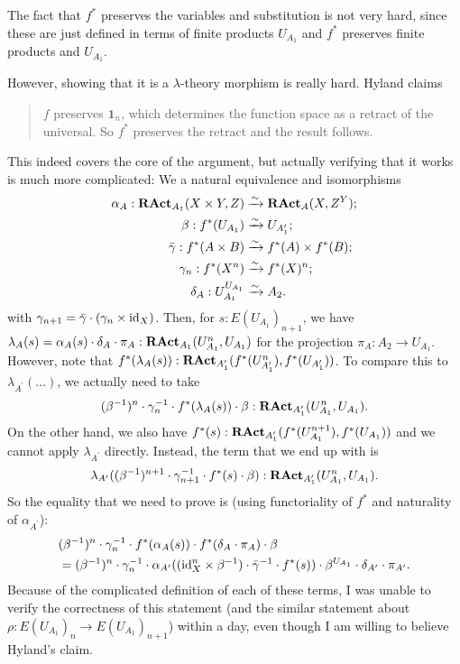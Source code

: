\begin{remark}
  The fact that $ f^* $ preserves the variables and substitution is not very hard, since these are just defined in terms of finite products $ U_{A_1} $ and $ f^* $ preserves finite products and $ U_{A_1} $.

  However, showing that it is a $ \lambda $-theory morphism is really hard. Hyland claims
  \begin{quote}
    $ f $ preserves $ \mathbf 1_n $, which determines the function space as a retract of the universal. So $ f^* $ preserves the retract and the result follows.
  \end{quote}
  This indeed covers the core of the argument, but actually verifying that it works is much more complicated: We a natural equivalence and isomorphisms
  \begin{align*}
    \alpha_A: \mathbf{RAct}_{A_1}(X \times Y, Z) &\xrightarrow{\sim} \mathbf{RAct}_{A}(X, Z^Y);\\
    \beta: f^*(U_{A_1}) &\xrightarrow{\sim} U_{A_1^\prime};\\
    \bar \gamma: f^*(A \times B) &\xrightarrow{\sim} f^*(A) \times f^*(B);\\
    \gamma_n: f^*(X^n) &\xrightarrow{\sim} f^*(X)^n;\\
    \delta_A: U_{A_1}^{U_{A_1}} &\xrightarrow{\sim} A_2.
  \end{align*}
  with $ \gamma_{n + 1} = \bar{\gamma} \cdot (\gamma_n \times \text{id}_{X}) $.
  Then, for $ s: E(U_{A_1})_{n + 1} $, we have $ \lambda_A(s) = \alpha_A(s) \cdot \delta_A \cdot \pi_A : \mathbf{RAct}_{A_1}(U_{A_1}^n, U_{A_1}) $ for the projection $ \pi_A: A_2 \to U_{A_1} $. However, note that $ f^*(\lambda_A(s)): \mathbf{RAct}_{A^\prime_1}(f^*(U_{A^\prime_1}^n), f^*(U_{A^\prime_1})) $. To compare this to $ \lambda_{A^\prime}(\dots) $, we actually need to take
  \[ (\beta^{-1})^n \cdot \gamma_n^{-1} \cdot f^*(\lambda_A(s)) \cdot \beta : \mathbf{RAct}_{A^\prime_1}(U_{A_1}^n, U_{A_1}). \]
  On the other hand, we also have $ f^*(s): \mathbf{RAct}_{A^\prime_1}(f^*(U_{A_1}^{n + 1}), f^*(U_{A_1})) $ and we cannot apply $ \lambda_{A^\prime} $ directly. Instead, the term that we end up with is
  \[ \lambda_{A^\prime}((\beta^{-1})^{n + 1} \cdot \gamma_{n + 1}^{-1} \cdot f^*(s) \cdot \beta): \mathbf{RAct}_{A^\prime_1}(U_{A_1}^n, U_{A_1}). \]
  So the equality that we need to prove is (using functoriality of $ f^* $ and naturality of $ \alpha_{A^\prime} $):
  \begin{align*}
    &(\beta^{-1})^n \cdot \gamma_n^{-1} \cdot f^*(\alpha_A(s)) \cdot f^*(\delta_A \cdot \pi_A) \cdot \beta\\
    &= (\beta^{-1})^n \cdot \gamma_n^{-1} \cdot \alpha_{A^\prime}((\text{id}_{X}^n \times \beta^{-1}) \cdot \bar{\gamma}^{-1} \cdot f^*(s)) \cdot \beta^{U_{A_1}} \cdot \delta_{A^\prime} \cdot \pi_{A^\prime}.
  \end{align*}
  Because of the complicated definition of each of these terms, I was unable to verify the correctness of this statement (and the similar statement about $ \rho: E(U_{A_1})_n \to E(U_{A_1})_{n + 1} $) within a day, even though I am willing to believe Hyland's claim.
  \TODO


\end{remark}
